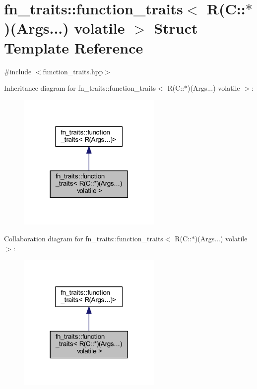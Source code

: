 \hypertarget{structfn__traits_1_1function__traits_3_01_r_07_c_1_1_5_08_07_args_8_8_8_08_01volatile_01_4}{}\section{fn\+\_\+traits\+:\+:function\+\_\+traits$<$ R(C\+:\+:$\ast$)(Args...) volatile $>$ Struct Template Reference}
\label{structfn__traits_1_1function__traits_3_01_r_07_c_1_1_5_08_07_args_8_8_8_08_01volatile_01_4}


{\ttfamily \#include $<$function\+\_\+traits.\+hpp$>$}



Inheritance diagram for fn\+\_\+traits\+:\+:function\+\_\+traits$<$ R(C\+:\+:$\ast$)(Args...) volatile $>$\+:\nopagebreak
\begin{figure}[H]
\begin{center}
\leavevmode
\includegraphics[width=197pt]{d9/d0d/structfn__traits_1_1function__traits_3_01_r_07_c_1_1_5_08_07_args_8_8_8_08_01volatile_01_4__inherit__graph}
\end{center}
\end{figure}


Collaboration diagram for fn\+\_\+traits\+:\+:function\+\_\+traits$<$ R(C\+:\+:$\ast$)(Args...) volatile $>$\+:\nopagebreak
\begin{figure}[H]
\begin{center}
\leavevmode
\includegraphics[width=197pt]{df/d53/structfn__traits_1_1function__traits_3_01_r_07_c_1_1_5_08_07_args_8_8_8_08_01volatile_01_4__coll__graph}
\end{center}
\end{figure}
